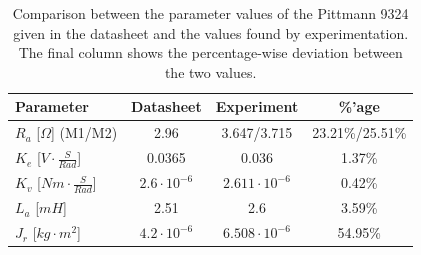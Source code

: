 \begin{table}
	\centering
	\begin{tabular}{|l|c|c|c|}
		\hline
		Parameter & Datasheet & Experiment & \%'age\\
		\hline
		$R_a$ [$\Omega$] (M1/M2) & 2.96 & 3.647/3.715 & 23.21\%/25.51\%\\
		$K_e$ [$V\cdot\frac{S}{Rad}$]& 0.0365 & 0.036 & 1.37\%\\
		$K_v$ [$Nm\cdot\frac{S}{Rad}$]& $2.6\cdot10^{-6}$ & $2.611\cdot10^{-6}$ & 0.42\%\\
		$L_a$ [$mH$]& 2.51 & 2.6 & 3.59\%\\
		$J_r$ [$kg\cdot m^2$]& $4.2\cdot10^{-6}$& $6.508\cdot10^{-6}$ & 54.95\%\\
		\hline
	\end{tabular}
	\caption[Comparison of parameter values.]{Comparison between the parameter values of the Pittmann 9324 given in the datasheet and the values found by experimentation. The final column shows the percentage-wise deviation between the two values.}
	\label{tab:compare}
\end{table}
